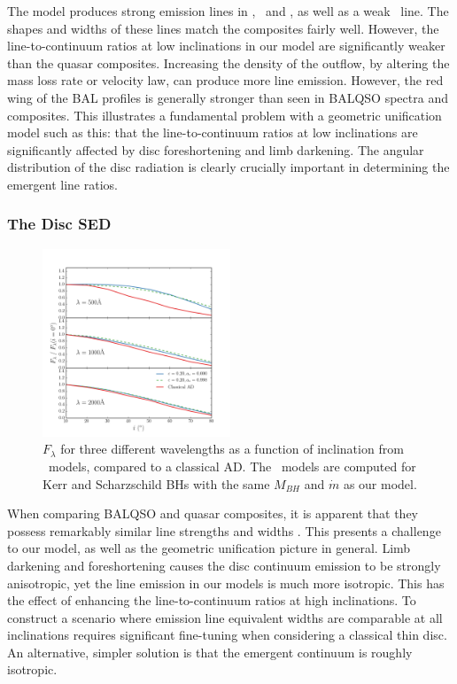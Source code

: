 \documentclass[useAMS,usenatbib]{mn2e_x}
\begin{document}
The model produces strong emission lines in \civ, \nv\ and \la,
as well as a weak \mg\ line. The shapes and widths of these lines
match the composites fairly well. However, the line-to-continuum ratios 
at low inclinations in our model are significantly weaker than the quasar 
composites. Increasing the density of the outflow, by altering the mass 
loss rate  or velocity law, can produce more line emission.
However, the red wing of the BAL profiles is generally stronger than 
seen in BALQSO spectra and composites. This illustrates a fundamental 
problem with a geometric unification model such as this:
that the line-to-continuum ratios at low inclinations are
significantly affected by disc foreshortening and limb darkening.
The angular distribution of the disc radiation is clearly
crucially important in determining the emergent line ratios.

\subsubsection{The Disc SED}
\label{discsed}

\begin{figure}
\centering
\includegraphics[width=0.5\textwidth]{figures/agnspec.png}
\caption
{
$F_\lambda$ for three different wavelengths
as a function of inclination from \agn\ models, 
compared to a classical AD. The \agn\ models are computed 
for Kerr and Scharzschild BHs with the same $M_{BH}$ and 
$\dot{m}$ as our model. 
}
\label{fig:f2000}
\end{figure}


When comparing BALQSO and quasar composites, it is apparent
that they possess remarkably similar line strengths and widths 
\citep[e.g.][]{weymann1991,reichard2003}.
This presents a challenge to our model, as well as the geometric 
unification picture in general.
Limb darkening and foreshortening causes the disc continuum emission to be 
strongly anisotropic, yet the line emission in our models is much more isotropic. 
This has the effect of enhancing the line-to-continuum ratios at high inclinations. 
To construct a scenario where emission 
line equivalent widths are comparable at all inclinations requires 
significant fine-tuning when considering a classical thin disc. 
An alternative, simpler solution is that the emergent continuum is roughly isotropic.
\end{document}

